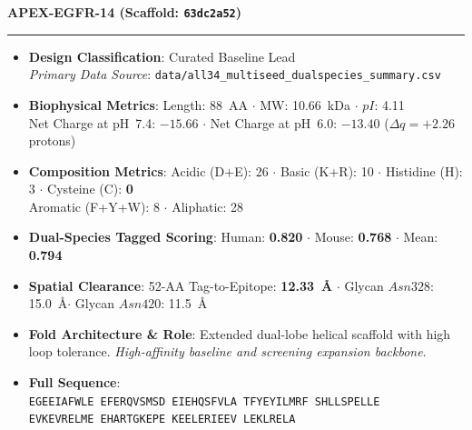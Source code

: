 \documentclass[11pt]{article}
\begin{document}
\noindent\textbf{\color{navyblue}\large APEX-EGFR-14  \quad (Scaffold: \texttt{63dc2a52})} \\
\vspace{-0.4em}
\rule{\textwidth}{0.6pt}
\vspace{-0.2em}
\begin{itemize}
  \setlength{\itemsep}{2pt}
  \setlength{\parskip}{0pt}
  \item \textbf{Design Classification}: Curated Baseline Lead \\
    \textit{Primary Data Source}: \texttt{\small data/all34\_multiseed\_dualspecies\_summary.csv}
  \item \textbf{Biophysical Metrics}: Length: 88~AA $\cdot$ MW: 10.66~kDa $\cdot$ $pI$: 4.11 \\
    Net Charge at pH~7.4: $-15.66$ $\cdot$ Net Charge at pH~6.0: $-13.40$ ($\Delta q = +2.26$ protons)
  \item \textbf{Composition Metrics}: Acidic (D+E): 26 $\cdot$ Basic (K+R): 10 $\cdot$ Histidine (H): 3 $\cdot$ Cysteine (C): \textbf{0} \\
    Aromatic (F+Y+W): 8 $\cdot$ Aliphatic: 28
  \item \textbf{Dual-Species Tagged Scoring}: Human: \textbf{0.820} $\cdot$ Mouse: \textbf{0.768} $\cdot$ Mean: \textbf{0.794}
  \item \textbf{Spatial Clearance}: 52-AA Tag-to-Epitope: \textbf{12.33~\AA} $\cdot$ Glycan $Asn328$: 15.0~\AA $\cdot$ Glycan $Asn420$: 11.5~\AA
  \item \textbf{Fold Architecture \& Role}: Extended dual-lobe helical scaffold with high loop tolerance. \textit{High-affinity baseline and screening expansion backbone}.
  \item \textbf{Full Sequence}: \\
    \texttt{\small EGEEIAFWLE EFERQVSMSD EIEHQSFVLA TFYEYILMRF SHLLSPELLE \\
    EVKEVRELME EHARTGKEPE KEELERIEEV LEKLRELA}
\end{itemize}
\vspace{0.8em}
\end{document}
